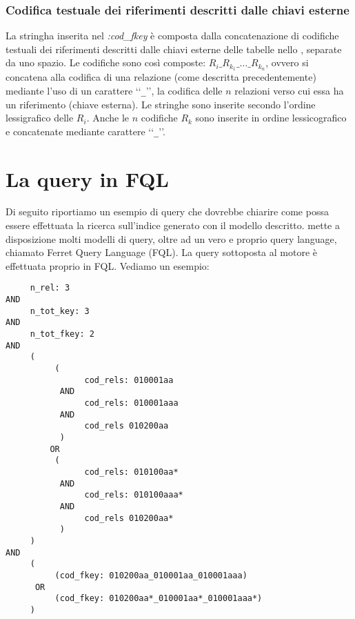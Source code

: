 \subsubsection*{Codifica testuale dei riferimenti descritti dalle chiavi esterne}
\noindent La stringha inserita nel \f {\em :cod\_fkey} è composta dalla concatenazione di codifiche testuali dei riferimenti descritti dalle chiavi esterne delle tabelle nello \se, separate da uno spazio. Le codifiche sono così composte: $R_{i}\_R_{k_1}\_\dots\_R_{k_n}$, ovvero si concatena alla codifica di una relazione (come descritta precedentemente) mediante l'uso di un carattere \lq\lq{\tt \_}\rq\rq, la codifica delle $n$ relazioni verso cui essa ha un riferimento (chiave esterna). Le stringhe sono inserite secondo l'ordine lessigrafico delle $R_{i}$. Anche le $n$ codifiche $R_k$ sono inserite in ordine lessicografico e concatenate mediante carattere \lq\lq{\tt \_}\rq\rq.

\section*{La query in FQL}
Di seguito riportiamo un esempio di query che dovrebbe chiarire come possa essere effettuata la ricerca sull'indice generato con il modello descritto. \fer mette a disposizione molti modelli di query, oltre ad un vero e proprio query language, chiamato Ferret Query Language (FQL). La query sottoposta al motore è effettuata proprio in FQL. Vediamo un esempio:
\begin{verbatim}
     n_rel: 3 
AND 
     n_tot_key: 3 
AND 
     n_tot_fkey: 2 
AND 
     (	
          (
                cod_rels: 010001aa 
           AND 
                cod_rels: 010001aaa 
           AND 
                cod_rels 010200aa
           ) 
         OR 
          (
                cod_rels: 010100aa* 
           AND 
                cod_rels: 010100aaa* 
           AND 
                cod_rels 010200aa*
           )
     ) 
AND 
     (
          (cod_fkey: 010200aa_010001aa_010001aaa) 
      OR 
          (cod_fkey: 010200aa*_010001aa*_010001aaa*)
     )
\end{verbatim}


